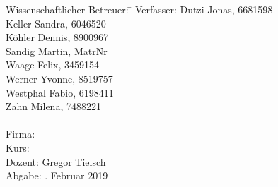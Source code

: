 \begin{titlepage}
\begin{center}
\begin{minipage}{\textwidth}
\begin{tabbing}
	Wissenschaftlicher Betreuer: \hspace{0.35cm}\=\kill
	Verfasser: 
		\> Dutzi Jonas, 6681598 \\
		\> Keller Sandra, 6046520 \\
		\> Köhler Dennis, 8900967 \\
		\> Sandig Martin, MatrNr \\
		\> Waage Felix, 3459154 \\
		\> Werner Yvonne, 8519757 \\
		\> Westphal Fabio, 6198411 \\
		\> Zahn Milena, 7488221 \\\\
	Firma: \> \DerNameDerFirma  \\[1.5mm]
	Kurs: \> \DieKursbezeichnung \\[1.5mm]
	Dozent: \> Gregor Tielsch \\[1.5mm]
	Abgabe: . Februar 2019
\end{tabbing}
\end{minipage}

\end{center}

\end{titlepage}